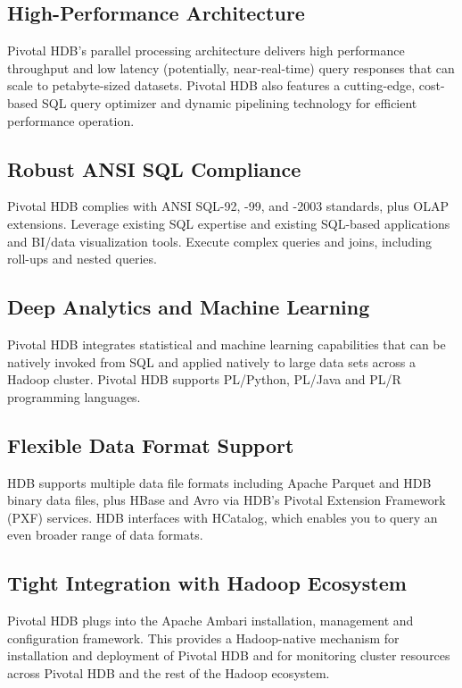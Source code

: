 \documentclass[9pt,twocolumn,twoside]{../../styles/osajnl}
\begin{document}
\subsection{High-Performance Architecture}

Pivotal HDB’s parallel processing architecture delivers high
performance throughput and low latency (potentially, near-real-time)
query responses that can scale to petabyte-sized datasets. Pivotal
HDB also features a cutting-edge, cost-based SQL query optimizer and
dynamic pipelining technology for efficient performance operation.

\subsection{Robust ANSI SQL Compliance}

Pivotal HDB complies with ANSI SQL-92, -99, and -2003 standards, plus
OLAP extensions. \CE Leverage existing SQL expertise and existing
SQL-based applications and BI/data visualization tools. Execute
complex queries and joins, including roll-ups and nested queries.

\subsection{Deep Analytics and Machine Learning}

Pivotal HDB integrates statistical and machine learning capabilities
that can be natively invoked from SQL and applied natively to large
data sets across a Hadoop cluster. Pivotal HDB supports PL/Python,
PL/Java and PL/R programming languages.

\subsection{Flexible Data Format Support}

HDB supports multiple data file formats including Apache Parquet and
HDB binary data files, plus HBase and Avro via HDB’s Pivotal
Extension Framework (PXF) services. HDB interfaces with HCatalog,
which enables you to query an even broader range of data formats.

\subsection{Tight Integration with Hadoop Ecosystem}

Pivotal HDB plugs into the Apache Ambari  \CE installation, management and
configuration framework. This provides a Hadoop-native mechanism for
installation and deployment of Pivotal HDB and for monitoring cluster
resources across Pivotal HDB and the rest of the Hadoop ecosystem.
\end{document}
